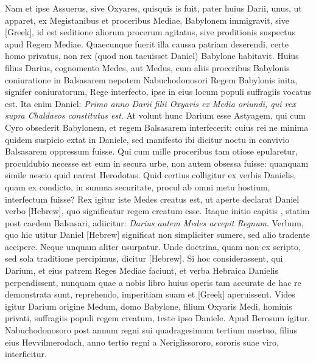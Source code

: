 Nam et ipse Assuerus,
sive Oxyares, quisquis is fuit, pater huius Darii, unus, ut apparet,
ex Megistanibus et proceribus Mediae, Babylonem immigravit,
sive \textgreek{[Greek]}, id est seditione aliorum procerum agitatus,
sive proditionis suspectus apud Regem Mediae.
Quaecunque fuerit
illa caussa patriam deserendi, certe homo privatus, non rex
(quod non tacuisset Daniel) Babylone habitavit.
Huius filius Darius,
cognomento Medes, aut Medus, cum aliis proceribus Babylonis
coniuratione in Balsasarem nepotem Nabuchodonosori Regem
Babylonis inita, signifer coniuratorum, Rege interfecto, ipse
in eius locum populi suffragiis vocatus est.
Ita enim Daniel: \textit{Primo
anno Darii filii Oxyaris ex Media oriundi, qui rex supra Chaldaeos
constitutus est}.
At volunt hunc Darium esse Astyagem, qui cum
Cyro obsederit Babylonem, et regem Balsasarem interfecerit: cuius
rei ne minima quidem suspicio extat in Daniele, sed manifesto
ibi dicitur noctu in convivio Balsasarem oppressum fuisse.
Qui
cum mille proceribus tam otiose epularetur, proculdubio necesse
est eum in secura urbe, non autem obsessa fuisse: quanquam simile
nescio quid narrat Herodotus.
Quid certius colligitur ex verbis
Danielis, quam ex condicto, in summa securitate, procul ab omni
metu hostium, interfectum fuisse?
Rex igitur iste Medes creatus
est, ut aperte declarat Daniel verbo
 \texthebrew{[Hebrew]}, quo significatur regem
creatum esse.
Itaque initio capitis , statim post caedem Balsasari,
adiicitur: \textit{Darius autem Medes accepit Regnum}.
Verbum,
quo hic utitur Daniel \texthebrew{[Hebrew]}
 significat non simpliciter sumere, sed
alio tradente accipere.
Neque unquam aliter usurpatur.
Unde doctrina,
quam non ex scripto, sed sola traditione percipimus, dicitur
\texthebrew{[Hebrew]}.
Si hoc considerassent, qui Darium, et eius patrem Reges
Mediae faciunt, et verba Hebraica Danielis perpendissent,
nunquam quae a nobis libro  huius operis tam accurate de hac
re demonstrata sunt, reprehendo, imperitiam suam et \textgreek{[Greek]}
aperuissent.
Vides igitur Darium origine Medum, domo Babylone,
filium Oxyaris Medi, hominis privati, suffragiis populi regem
creatum, teste ipso Daniele.
Apud Berosum igitur, Nabuchodonosoro
post annum regni sui quadragesimum tertium mortuo, filius
eius Hevvilmerodach, anno tertio regni a Neriglissororo, sororis
suae viro, interficitur.

